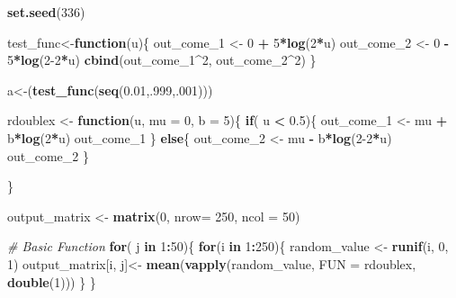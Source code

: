 \documentclass[]{article}
\newenvironment{Shaded}{\begin{snugshade}}{\end{snugshade}}
\newcommand{\CommentTok}[1]{\textcolor[rgb]{0.56,0.35,0.01}{\textit{#1}}}
\newcommand{\ControlFlowTok}[1]{\textcolor[rgb]{0.13,0.29,0.53}{\textbf{#1}}}
\newcommand{\DataTypeTok}[1]{\textcolor[rgb]{0.13,0.29,0.53}{#1}}
\newcommand{\DecValTok}[1]{\textcolor[rgb]{0.00,0.00,0.81}{#1}}
\newcommand{\FloatTok}[1]{\textcolor[rgb]{0.00,0.00,0.81}{#1}}
\newcommand{\KeywordTok}[1]{\textcolor[rgb]{0.13,0.29,0.53}{\textbf{#1}}}
\newcommand{\NormalTok}[1]{#1}
\newcommand{\OperatorTok}[1]{\textcolor[rgb]{0.81,0.36,0.00}{\textbf{#1}}}
\newcommand{\StringTok}[1]{\textcolor[rgb]{0.31,0.60,0.02}{#1}}
\begin{document}
\begin{Shaded}
\begin{Highlighting}[]
\KeywordTok{set.seed}\NormalTok{(}\DecValTok{336}\NormalTok{)}

\NormalTok{test_func<-}\ControlFlowTok{function}\NormalTok{(u)\{}
\NormalTok{  out_come_}\DecValTok{1}\NormalTok{ <-}\StringTok{ }\DecValTok{0} \OperatorTok{+}\StringTok{ }\DecValTok{5}\OperatorTok{*}\KeywordTok{log}\NormalTok{(}\DecValTok{2}\OperatorTok{*}\NormalTok{u)}
\NormalTok{  out_come_}\DecValTok{2}\NormalTok{ <-}\StringTok{ }\DecValTok{0} \OperatorTok{-}\StringTok{ }\DecValTok{5}\OperatorTok{*}\KeywordTok{log}\NormalTok{(}\DecValTok{2-2}\OperatorTok{*}\NormalTok{u)}
  \KeywordTok{cbind}\NormalTok{(out_come_}\DecValTok{1}\OperatorTok{^}\DecValTok{2}\NormalTok{, out_come_}\DecValTok{2}\OperatorTok{^}\DecValTok{2}\NormalTok{)}
\NormalTok{\}}

\NormalTok{a<-(}\KeywordTok{test_func}\NormalTok{(}\KeywordTok{seq}\NormalTok{(}\FloatTok{0.01}\NormalTok{,.}\DecValTok{999}\NormalTok{,.}\DecValTok{001}\NormalTok{)))}

\NormalTok{rdoublex <-}\StringTok{ }\ControlFlowTok{function}\NormalTok{(u, }\DataTypeTok{mu =} \DecValTok{0}\NormalTok{, }\DataTypeTok{b =} \DecValTok{5}\NormalTok{)\{}
  \ControlFlowTok{if}\NormalTok{( u }\OperatorTok{<}\StringTok{ }\FloatTok{0.5}\NormalTok{)\{}
\NormalTok{    out_come_}\DecValTok{1}\NormalTok{ <-}\StringTok{ }\NormalTok{mu }\OperatorTok{+}\StringTok{ }\NormalTok{b}\OperatorTok{*}\KeywordTok{log}\NormalTok{(}\DecValTok{2}\OperatorTok{*}\NormalTok{u)}
\NormalTok{    out_come_}\DecValTok{1}
\NormalTok{  \} }\ControlFlowTok{else}\NormalTok{\{}
\NormalTok{     out_come_}\DecValTok{2}\NormalTok{ <-}\StringTok{ }\NormalTok{mu }\OperatorTok{-}\StringTok{ }\NormalTok{b}\OperatorTok{*}\KeywordTok{log}\NormalTok{(}\DecValTok{2-2}\OperatorTok{*}\NormalTok{u)}
\NormalTok{     out_come_}\DecValTok{2}
\NormalTok{  \}}
    
\NormalTok{\}}


\NormalTok{output_matrix <-}\StringTok{ }\KeywordTok{matrix}\NormalTok{(}\DecValTok{0}\NormalTok{, }\DataTypeTok{nrow=} \DecValTok{250}\NormalTok{, }\DataTypeTok{ncol =} \DecValTok{50}\NormalTok{)}

\CommentTok{# Basic Function}
\ControlFlowTok{for}\NormalTok{( j }\ControlFlowTok{in} \DecValTok{1}\OperatorTok{:}\DecValTok{50}\NormalTok{)\{}
  \ControlFlowTok{for}\NormalTok{(i }\ControlFlowTok{in} \DecValTok{1}\OperatorTok{:}\DecValTok{250}\NormalTok{)\{}
\NormalTok{    random_value <-}\StringTok{ }\KeywordTok{runif}\NormalTok{(i, }\DecValTok{0}\NormalTok{, }\DecValTok{1}\NormalTok{)}
\NormalTok{    output_matrix[i, j]<-}\StringTok{ }\KeywordTok{mean}\NormalTok{(}\KeywordTok{vapply}\NormalTok{(random_value, }\DataTypeTok{FUN =}\NormalTok{ rdoublex, }\KeywordTok{double}\NormalTok{(}\DecValTok{1}\NormalTok{)))}
\NormalTok{  \}}
\NormalTok{\}}


\end{Highlighting}
\end{Shaded}
\end{document}
